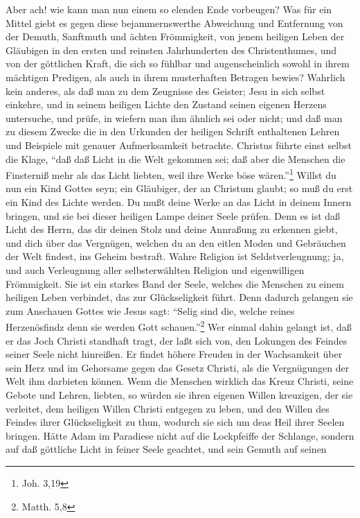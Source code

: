 Aber ach! wie kann man nun einem so elenden Ende vorbeugen? Was für ein Mittel
giebt es gegen diese bejammernswerthe Abweichung und Entfernung von der Demuth,
Sanftmuth und ächten Frömmigkeit, von jenem heiligen Leben der Gläubigen in den
ersten und reinsten Jahrhunderten des Christenthumes, und von der göttlichen
Kraft, die sich so fühlbar und augenscheinlich sowohl in ihrem mächtigen
Predigen, als auch in ihrem musterhaften Betragen bewies? Wahrlich kein anderes,
als daß man zu dem Zeugnisse des Geister; Jesu in sich selbst einkehre, und in
seinem heiligen Lichte den Zustand seinen eigenen Herzens untersuche, und prüfe,
in wiefern man ihm ähnlich sei oder nicht; und daß man zu diesem Zwecke die in
den Urkunden der heiligen Schrift enthaltenen Lehren und Beispiele mit genauer
Aufmerksamkeit betrachte. Christus führte einst selbst die Klage, "`daß daß
Licht in die Welt gekommen sei; daß aber die Menschen die Finsterniß mehr als
das Licht liebten, weil ihre Werke böse wären."'\footnote{Joh. 3,19} Willst du
nun ein Kind Gottes seyn; ein Gläubiger, der an Christum glaubt; so muß du erst
ein Kind des Lichte werden. Du mußt deine Werke an das Licht in deinem Innern
bringen, und sie bei dieser heiligen Lampe deiner Seele prüfen. Denn es ist daß
Licht des Herrn, das dir deinen Stolz und deine Annraßung zu erkennen giebt, und
dich über das Vergnügen, welchen du an den eitlen Moden und Gebräuchen der Welt
findest, ins Geheim bestraft. Wahre Religion ist Seldstverleugnung; ja, und auch
Verleugnung aller selbsterwählten Religion und eigenwilligen Frömmigkeit. Sie
ist ein starkes Band der Seele, welches die Menschen zu einem heiligen Leben
verbindet, das zur Glückseligkeit führt. Denn dadurch gelangen sie zum Anschauen
Gottes wie Jesus sagt: "`Selig sind die, welche reines Herzenösfindz denn sie
werden Gott schauen."'\footnote{Matth. 5,8} Wer einmal dahin gelangt ist, daß er
das Joch Christi standhaft tragt, der laßt sich von, den Lokungen des Feindes
seiner Seele nicht hinreißen. Er findet höhere Freuden in der Wachsamkeit über
sein Herz und im Gehorsame gegen das Gesetz Christi, als die Vergnügungen der
Welt ihm darbieten können. Wenn die Menschen wirklich das Kreuz Christi, seine
Gebote und Lehren, liebten, so würden sie ihren eigenen Willen kreuzigen, der
sie verleitet, dem heiligen Willen Christi entgegen zu leben, und den Willen des
Feindes ihrer Glückseligkeit zu thun, wodurch sie sich um deas Heil ihrer Seelen
bringen. Hätte Adam im Paradiese nicht auf die Lockpfeiffe der Schlange, sondern
auf daß göttliche Licht in feiner Seele geachtet, und sein Gemuth auf seinen
